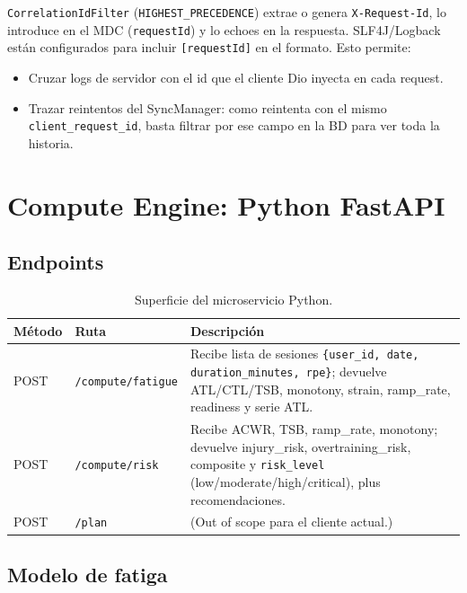 \documentclass[11pt,a4paper]{article}
\newcommand{\cls}[1]{\texttt{\small #1}}
\newcommand{\http}[1]{\texttt{\small #1}}
\begin{document}
\cls{CorrelationIdFilter} (\texttt{HIGHEST\_PRECEDENCE}) extrae o genera \texttt{X-Request-Id}, lo introduce en el MDC (\texttt{requestId}) y lo echoes en la respuesta. SLF4J/Logback están configurados para incluir \texttt{[requestId]} en el formato. Esto permite:

\begin{itemize}[leftmargin=*]
  \item Cruzar logs de servidor con el id que el cliente Dio inyecta en cada request.
  \item Trazar reintentos del SyncManager: como reintenta con el mismo \texttt{client\_request\_id}, basta filtrar por ese campo en la BD para ver toda la historia.
\end{itemize}

\section{Compute Engine: Python FastAPI}

\subsection{Endpoints}

\begin{table}[H]
\centering
\begin{tabularx}{\textwidth}{lXX}
\toprule
\textbf{Método} & \textbf{Ruta} & \textbf{Descripción} \\
\midrule
POST & \http{/compute/fatigue} & Recibe lista de sesiones \texttt{\{user\_id, date, duration\_minutes, rpe\}}; devuelve ATL/CTL/TSB, monotony, strain, ramp\_rate, readiness y serie ATL. \\
POST & \http{/compute/risk}    & Recibe ACWR, TSB, ramp\_rate, monotony; devuelve injury\_risk, overtraining\_risk, composite y \texttt{risk\_level} (low/moderate/high/critical), plus recomendaciones. \\
POST & \http{/plan}            & (Out of scope para el cliente actual.) \\
\bottomrule
\end{tabularx}
\caption{Superficie del microservicio Python.}
\end{table}

\subsection{Modelo de fatiga}
\end{document}

